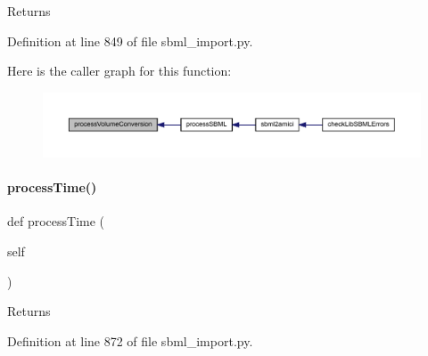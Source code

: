 \begin{DoxyReturn}{Returns}

\end{DoxyReturn}


Definition at line 849 of file sbml\+\_\+import.\+py.

Here is the caller graph for this function\+:
\nopagebreak
\begin{figure}[H]
\begin{center}
\leavevmode
\includegraphics[width=350pt]{classamici_1_1sbml__import_1_1_sbml_importer_af2a2cbf8550d30fc0e95a875758b8262_icgraph}
\end{center}
\end{figure}
\mbox{\label{classamici_1_1sbml__import_1_1_sbml_importer_a2819c6ad1b541e49e728aa172e57208e}} 
\paragraph{\texorpdfstring{process\+Time()}{processTime()}}
{\footnotesize\ttfamily def process\+Time (\begin{DoxyParamCaption}\item[{}]{self }\end{DoxyParamCaption})}

\begin{DoxyReturn}{Returns}

\end{DoxyReturn}


Definition at line 872 of file sbml\+\_\+import.\+py.

